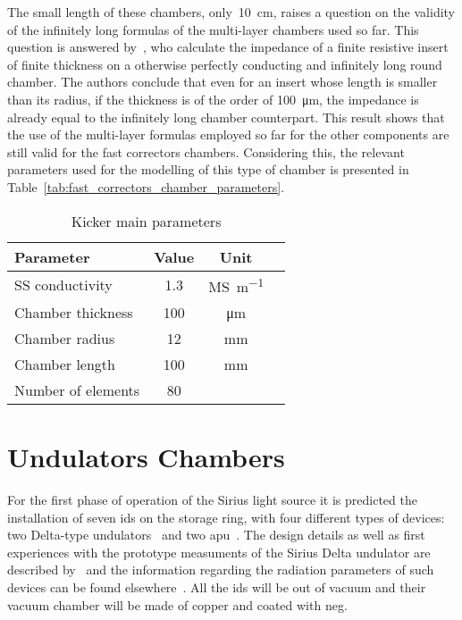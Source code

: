     The small length of these chambers, only~\SI{10}{\centi\meter}, raises a question on the validity of the infinitely long formulas of the multi-layer chambers used so far. This question is answered by~, who calculate the impedance of a finite resistive insert of finite thickness on a otherwise perfectly conducting and infinitely long round chamber. The authors conclude that even for an insert whose length is smaller than its radius, if the thickness is of the order of \SI{100}{\micro\meter}, the impedance is already equal to the infinitely long chamber counterpart. This result shows that the use of the multi-layer formulas employed so far for the other components are still valid for the fast correctors chambers. Considering this, the relevant parameters used for the modelling of this type of chamber is presented in Table~\ref{tab:fast_correctors_chamber_parameters}.
    \begin{table}[b]
        \centering
        \caption{Kicker main parameters}
        \label{tab:kicker_paramters}
        \begin{tabular}{lccc}
            \toprule
            Parameter            & Value      & Unit \\
            \midrule
            SS conductivity      & 1.3  & \si{\mega\siemens\per\meter}\\
            Chamber thickness    & 100  & \si{\micro\meter}\\
            Chamber radius       & 12   & \si{\milli\meter}\\
            Chamber length       & 100  & \si{\milli\meter}\\
            Number of elements   &  80  & \\
            \bottomrule
        \end{tabular}
    \end{table}

\section{Undulators Chambers}

    For the first phase of operation of the Sirius light source it is predicted the installation of seven \gls{ids} on the storage ring, with four different types of devices: two Delta-type undulators~\cite{Temnykh2008} and two \gls{apu}~\cite{Carr1991}. The design details as well as first experiences with the prototype measuments of the Sirius Delta undulator are described by~ and the information regarding the radiation parameters of such devices can be found elsewhere~\cite{Sirius2013}. All the \gls{ids} will be out of vacuum and their vacuum chamber will be made of copper and coated with \gls{neg}.

